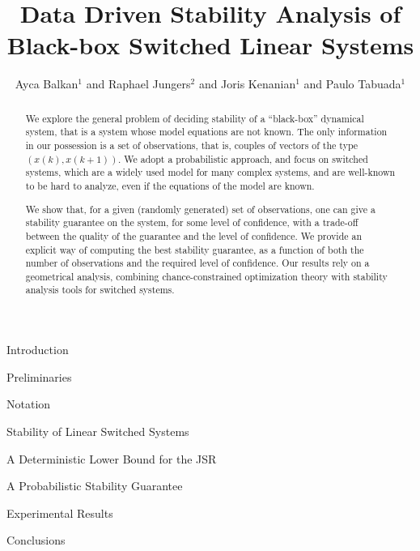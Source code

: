 \documentclass[letterpaper, 10 pt, conference]{ieeeconf}
\title{Data Driven Stability Analysis of Black-box Switched Linear Systems}
\author{Ayca Balkan$^{1}$ and Raphael Jungers$^{2}$ and Joris Kenanian$^{1}$ and Paulo Tabuada$^{1}$ }
\begin{document}
\maketitle

\begin{abstract}
We explore the general problem of deciding stability of a ``black-box'' dynamical system, that is a system whose model equations are not known. The only information in our possession is a set of observations, that is, couples of vectors of the type $(x(k), x(k+1))$. We adopt a probabilistic approach, and focus on switched systems, which are a widely used model for many complex systems, and are well-known to be hard to analyze, even if the equations of the model are known.

We show that, for a given (randomly generated) set of observations, one can give a stability guarantee on the system, for some level of confidence, with a trade-off between the quality of the guarantee and the level of confidence. We provide an explicit way of computing the best stability guarantee, as a function of  both the number of observations and the required level of confidence. Our results rely on a geometrical analysis, combining chance-constrained optimization theory with stability analysis tools for switched systems.
\end{abstract}

\begin{section}{Introduction}

\end{section}

\begin{section}{Preliminaries}
\label{sec:preliminaries}
\begin{subsection}{Notation}
 
\end{subsection}
\begin{subsection}{Stability of Linear Switched Systems}

\end{subsection}
\end{section}

\begin{section}{A Deterministic Lower Bound for the JSR}
\label{sec:lowerbound}

\end{section}

\begin{section}{A Probabilistic Stability Guarantee}
\label{sec:upperbound}



%
%
%
\end{section}

\begin{section}{Experimental Results}
\label{sec:experiments}

\end{section}

\begin{section}{Conclusions}
\label{sec:conclusions}

\end{section}

\appendix
\label{appendix}





\end{document}
